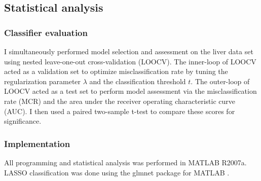 \subsection{Statistical analysis}
\subsubsection{Classifier evaluation}
I simultaneously performed model selection and assessment on the liver data set using nested leave-one-out cross-validation (LOOCV). The inner-loop of LOOCV acted as a validation set to optimize misclassification rate by tuning the regularization parameter $\lambda$ and the classification threshold $t$. The outer-loop of LOOCV acted as a test set to perform model assessment via the misclassification rate (MCR) and the area under the receiver operating characteristic curve (AUC). I then used a paired two-sample t-test to compare these scores for significance. 

\subsubsection{Implementation}
All programming and statistical analysis was performed in MATLAB R2007a. LASSO classification was done using the glmnet package for MATLAB \cite{Friedman:2009wm}.